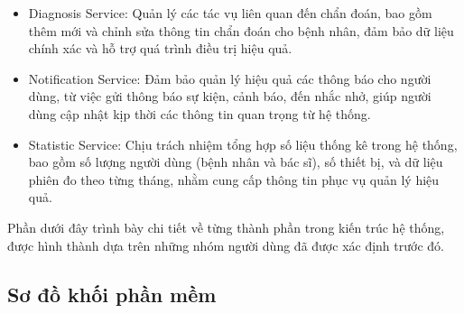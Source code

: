 \begin{adjustwidth}{1.5em}{}
\begin{itemize}
		\item Diagnosis Service: Quản lý các tác vụ liên quan đến chẩn đoán, bao gồm thêm mới và chỉnh sửa thông tin chẩn đoán cho bệnh nhân, đảm bảo dữ liệu chính xác và hỗ trợ quá trình điều trị hiệu quả.
		\item Notification Service: Đảm bảo quản lý hiệu quả các thông báo cho người dùng, từ việc gửi thông báo sự kiện, cảnh báo, đến nhắc nhở,
		      giúp người dùng cập nhật kịp thời các thông tin quan trọng từ hệ thống.
		\item Statistic Service: Chịu trách nhiệm tổng hợp số liệu thống kê trong hệ thống, bao gồm số lượng người dùng (bệnh nhân và bác sĩ),
		      số thiết bị, và dữ liệu phiên đo theo từng tháng, nhằm cung cấp thông tin phục vụ quản lý hiệu quả.
	\end{itemize}
\end{adjustwidth}

Phần dưới đây trình bày chi tiết về từng thành phần trong kiến trúc hệ thống, được hình thành dựa trên những nhóm người dùng đã được xác định trước đó.
\newpage
\subsection{Sơ đồ khối phần mềm}

